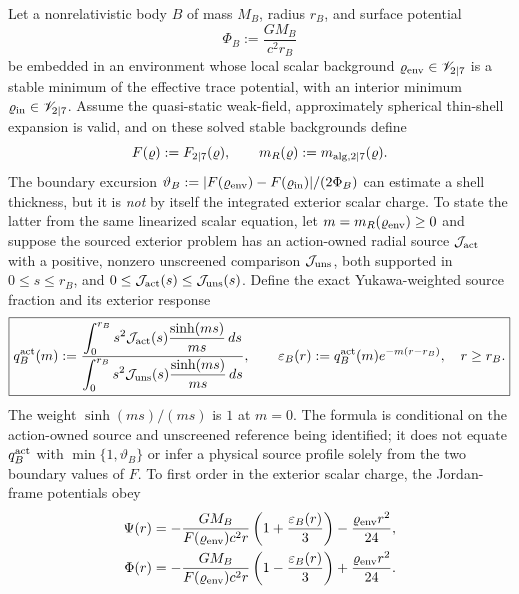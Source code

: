 \documentclass[12pt,a4paper]{article}
\begin{document}
\begin{theorem}
\label{p8:thm:smooth-solar-system-screening-ppn}
Let a nonrelativistic body $B$ of mass $M_B$, radius $r_B$, and surface
potential
\[
 \Phi_B:=\frac{GM_B}{c^2r_B}
\]
be embedded in an environment whose local scalar background
\(\varrho_{\rm env}\in\mathscr V_{2\mid7}\) is a stable minimum of the effective trace
potential, with an interior minimum \(\varrho_{\rm in}\in\mathscr V_{2\mid7}\).
Assume the quasi-static weak-field, approximately spherical thin-shell
expansion is valid, and on these solved stable backgrounds define
\[
F(\varrho):=F_{2\mid7}(\varrho),
\qquad
m_R(\varrho):=m_{{\rm alg},2\mid7}(\varrho).
\]
The boundary excursion
\(\vartheta_B:=|F(\varrho_{\rm env})-F(\varrho_{\rm in})|/(2\Phi_B)\)
can estimate a shell thickness, but it is \emph{not} by itself the
integrated exterior scalar charge. To state the latter from the same
linearized scalar equation, let \(m=m_R(\varrho_{\rm env})\geq0\) and
suppose the sourced exterior problem has an action-owned radial source
\(\mathcal J_{\rm act}\) with a positive, nonzero unscreened comparison
\(\mathcal J_{\rm uns}\), both supported in \(0\leq s\leq r_B\), and
\(0\leq\mathcal J_{\rm act}(s)\leq\mathcal J_{\rm uns}(s)\).
Define the exact Yukawa-weighted source fraction and its exterior response
\begin{equation}
\label{p8:eq:smooth-screening-epsilon}
 \boxed{
 q_B^{\rm act}(m):=
 \frac{\displaystyle\int_0^{r_B}s^2\mathcal J_{\rm act}(s)
          \frac{\sinh(ms)}{ms}\,ds}
      {\displaystyle\int_0^{r_B}s^2\mathcal J_{\rm uns}(s)
          \frac{\sinh(ms)}{ms}\,ds},\qquad
 \varepsilon_B(r):=q_B^{\rm act}(m)e^{-m(r-r_B)},\quad r\geq r_B.}
\end{equation}
The weight \(\sinh(ms)/(ms)\) is \(1\) at \(m=0\). The formula is
conditional on the action-owned source and unscreened reference being
identified; it does not equate \(q_B^{\rm act}\) with
\(\min\{1,\vartheta_B\}\) or infer a physical source profile solely
from the two boundary values of \(F\).
To first order in the exterior scalar charge, the Jordan-frame potentials obey
\begin{align}
\label{p8:eq:smooth-ppn-potentials}
 \Psi(r)&=-\frac{GM_B}{F(\varrho_{\rm env})c^2r}
 \left(1+\frac{\varepsilon_B(r)}3\right)
 -\frac{\varrho_{\rm env}r^2}{24},\\
 \Phi(r)&=-\frac{GM_B}{F(\varrho_{\rm env})c^2r}
 \left(1-\frac{\varepsilon_B(r)}3\right)
 +\frac{\varrho_{\rm env}r^2}{24}.
\end{align}

\end{theorem}
\end{document}
